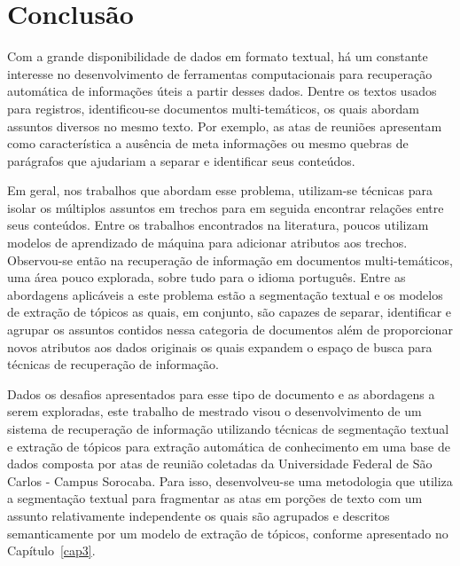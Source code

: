 \chapter{Conclusão}
\label{cap:conclusao}





Com a grande disponibilidade de dados em formato textual, há um constante interesse no desenvolvimento de ferramentas computacionais para recuperação automática de informações úteis a partir desses dados. 
Dentre os textos usados para registros, identificou-se documentos multi-temáticos, os quais abordam assuntos diversos no mesmo texto. Por exemplo, as atas de reuniões apresentam como característica a ausência de meta informações ou mesmo quebras de parágrafos que ajudariam a separar e identificar seus conteúdos. 


Em geral, nos trabalhos que abordam esse problema, utilizam-se técnicas para isolar os múltiplos assuntos em trechos para em seguida encontrar relações entre seus conteúdos.  Entre os trabalhos encontrados na literatura, poucos utilizam modelos de aprendizado de máquina para adicionar atributos aos trechos. Observou-se então na recuperação de informação em documentos multi-temáticos, uma área pouco explorada, sobre tudo para o idioma português. 
Entre as abordagens aplicáveis a este problema estão a segmentação textual e os modelos de extração de tópicos as quais, em conjunto, são capazes de separar, identificar e agrupar os assuntos contidos nessa categoria de documentos além de proporcionar novos atributos aos dados originais os quais expandem o espaço de busca para técnicas de recuperação de informação.








Dados os desafios apresentados para esse tipo de documento e as abordagens a serem exploradas, este trabalho de mestrado visou o desenvolvimento de um sistema de recuperação de informação utilizando técnicas de segmentação textual e extração de tópicos para extração automática de conhecimento em uma base de dados composta por atas de reunião coletadas da Universidade Federal de São Carlos - Campus Sorocaba. 
Para isso, desenvolveu-se uma metodologia que utiliza a segmentação textual para fragmentar as atas em porções de texto com um assunto relativamente independente os quais são agrupados e descritos semanticamente por um modelo de extração de tópicos, conforme apresentado no Capítulo~\ref{cap3}.

